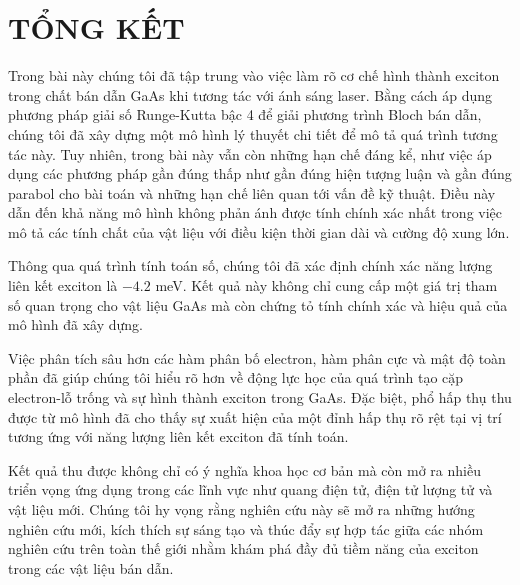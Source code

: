 \documentclass[%
reprint,
amsmath,amssymb,
superscriptaddress,
aps,
]{revtex4-2}
\begin{document}
\section{\label{sec:level4} TỔNG KẾT}
Trong bài này chúng tôi đã tập trung vào việc làm rõ cơ chế hình thành exciton trong chất bán dẫn GaAs khi tương tác với ánh sáng laser. Bằng cách áp dụng phương pháp giải số Runge-Kutta bậc 4 để giải phương trình Bloch bán dẫn, chúng tôi đã xây dựng một mô hình lý thuyết chi tiết để mô tả quá trình tương tác này. Tuy nhiên, trong bài này vẫn còn những hạn chế đáng kể, như việc áp dụng các phương pháp gần đúng thấp như gần đúng hiện tượng luận và gần đúng parabol cho bài toán và những hạn chế liên quan tới vấn đề kỹ thuật. Điều này dẫn đến khả năng mô hình không phản ánh được tính chính xác nhất trong việc mô tả các tính chất của vật liệu với điều kiện thời gian dài và cường độ xung lớn.

Thông qua quá trình tính toán số, chúng tôi đã xác định chính xác năng lượng liên kết exciton là $-4.2$ meV. Kết quả này không chỉ cung cấp một giá trị tham số quan trọng cho vật liệu GaAs mà còn chứng tỏ tính chính xác và hiệu quả của mô hình đã xây dựng.

Việc phân tích sâu hơn các hàm phân bố electron, hàm phân cực và mật độ toàn phần đã giúp chúng tôi hiểu rõ hơn về động lực học của quá trình tạo cặp electron-lỗ trống và sự hình thành exciton trong GaAs. Đặc biệt, phổ hấp thụ thu được từ mô hình đã cho thấy sự xuất hiện của một đỉnh hấp thụ rõ rệt tại vị trí tương ứng với năng lượng liên kết exciton đã tính toán.

Kết quả thu được không chỉ có ý nghĩa khoa học cơ bản mà còn mở ra nhiều triển vọng ứng dụng trong các lĩnh vực như quang điện tử, điện tử lượng tử và vật liệu mới. Chúng tôi hy vọng rằng nghiên cứu này sẽ mở ra những hướng nghiên cứu mới, kích thích sự sáng tạo và thúc đẩy sự hợp tác giữa các nhóm nghiên cứu trên toàn thế giới nhằm khám phá đầy đủ tiềm năng của exciton trong các vật liệu bán dẫn.

\appendix
\end{document}
